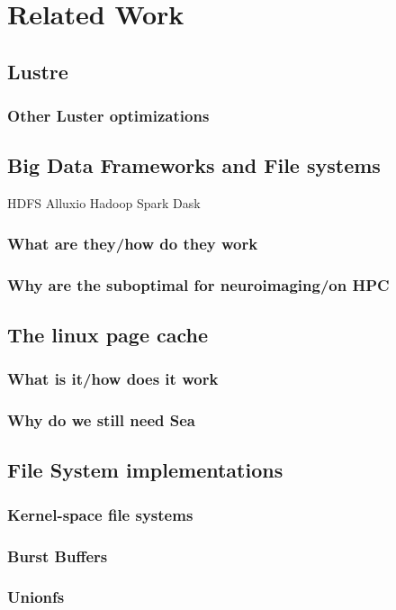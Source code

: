 \documentclass[10pt,journal,compsoc]{IEEEtran}
\begin{document}
\section{Related Work}
\subsection{Lustre}
\subsubsection{Other Luster optimizations}
\subsection{Big Data Frameworks and File systems}
HDFS Alluxio Hadoop Spark Dask
\subsubsection{What are they/how do they work}
\subsubsection{Why are the suboptimal for neuroimaging/on HPC}
\subsection{The linux page cache}
\subsubsection{What is it/how does it work}
\subsubsection{Why do we still need Sea}
\subsection{File System implementations}
\subsubsection{Kernel-space file systems}
\subsubsection{Burst Buffers}
\subsubsection{Unionfs}
\end{document}
